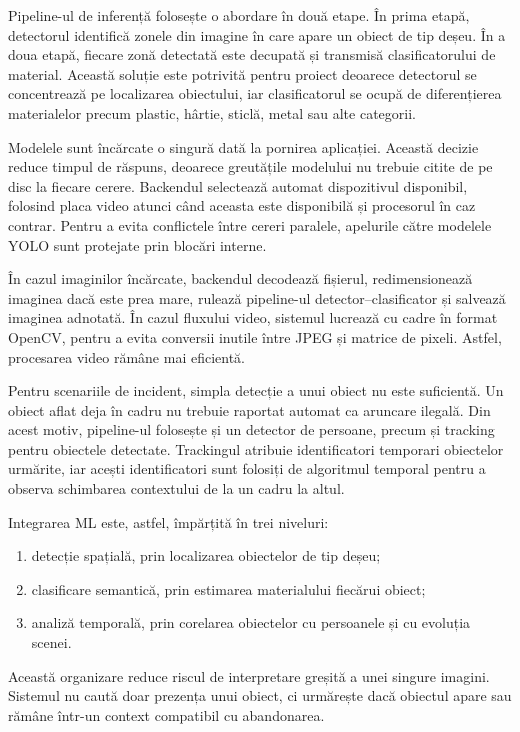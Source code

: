 Pipeline-ul de inferență folosește o abordare în două etape. În prima etapă, detectorul identifică zonele din imagine în care apare un obiect de tip deșeu. În a doua etapă, fiecare zonă detectată este decupată și transmisă clasificatorului de material. Această soluție este potrivită pentru proiect deoarece detectorul se concentrează pe localizarea obiectului, iar clasificatorul se ocupă de diferențierea materialelor precum plastic, hârtie, sticlă, metal sau alte categorii.

Modelele sunt încărcate o singură dată la pornirea aplicației. Această decizie reduce timpul de răspuns, deoarece greutățile modelului nu trebuie citite de pe disc la fiecare cerere. Backendul selectează automat dispozitivul disponibil, folosind placa video atunci când aceasta este disponibilă și procesorul în caz contrar. Pentru a evita conflictele între cereri paralele, apelurile către modelele YOLO sunt protejate prin blocări interne.

În cazul imaginilor încărcate, backendul decodează fișierul, redimensionează imaginea dacă este prea mare, rulează pipeline-ul detector--clasificator și salvează imaginea adnotată. În cazul fluxului video, sistemul lucrează cu cadre în format OpenCV, pentru a evita conversii inutile între JPEG și matrice de pixeli. Astfel, procesarea video rămâne mai eficientă.

Pentru scenariile de incident, simpla detecție a unui obiect nu este suficientă. Un obiect aflat deja în cadru nu trebuie raportat automat ca aruncare ilegală. Din acest motiv, pipeline-ul folosește și un detector de persoane, precum și tracking pentru obiectele detectate. Trackingul atribuie identificatori temporari obiectelor urmărite, iar acești identificatori sunt folosiți de algoritmul temporal pentru a observa schimbarea contextului de la un cadru la altul.

Integrarea ML este, astfel, împărțită în trei niveluri:

\begin{enumerate}
    \item detecție spațială, prin localizarea obiectelor de tip deșeu;
    \item clasificare semantică, prin estimarea materialului fiecărui obiect;
    \item analiză temporală, prin corelarea obiectelor cu persoanele și cu evoluția scenei.
\end{enumerate}

Această organizare reduce riscul de interpretare greșită a unei singure imagini. Sistemul nu caută doar prezența unui obiect, ci urmărește dacă obiectul apare sau rămâne într-un context compatibil cu abandonarea.

